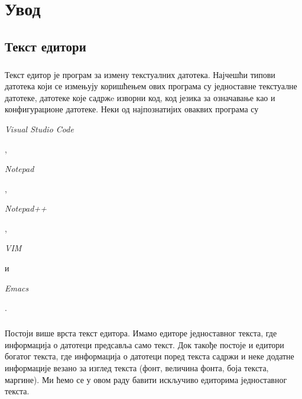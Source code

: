 \documentclass[12pt,oneside]{memoir}
\begin{document}
\frontmatter
\naslovna
\komisija
\apstrakt
\tableofcontents*

\mainmatter

\chapter{Увод}

\section{Текст едитори}

\paragraph{}
Текст едитор је програм за измену текстуалних датотека. Најчешћи типови датотека
који се измењују коришћењем ових програма су једноставне текстуалне датотеке, 
датотеке које садржe изворни код, код језика за означавање као и конфигурационе датотеке. 
Неки од најпознатијих оваквих програма су \begin{latinica}\textit{Visual Studio Code}
\end{latinica} \cite{VSC}, \begin{latinica}\textit{Notepad}\end{latinica} \cite{Notepad},
\begin{latinica}\textit{Notepad++}\end{latinica} \cite{Notepad++}, \begin{latinica}\textit{VIM}
\end{latinica} \cite{VIM} и \begin{latinica}\textit{Emacs}\end{latinica} \cite{Emacs}.

\paragraph{}
Постоји више врста текст едитора. Имамо едиторе једноставног текста, где информација
о датотеци предсавља само текст. Док такође постоје и едитори богатог текста, где
информација о датотеци поред текста садржи и неке додатне информације везано за изглед
текста (фонт, величина фонта, боја текста, маргине). Ми ћемо се у овом раду бавити искључиво
едиторима једноставног текста.
\end{document}
